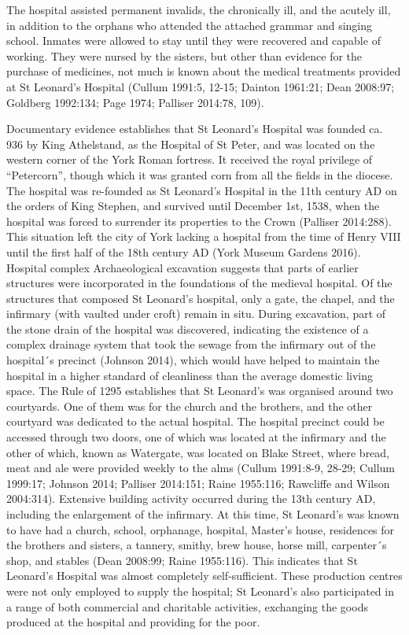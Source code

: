 \documentclass[%
	]{ijsra}
\begin{document}
 The hospital assisted permanent invalids, the chronically ill, and the acutely ill, in addition to the orphans who attended the attached grammar and singing school. Inmates were allowed to stay until they were recovered and capable of working. They were nursed by the sisters, but other than evidence for the purchase of medicines, not much is known about the medical treatments provided at St Leonard’s Hospital (Cullum 1991:5, 12-15; Dainton 1961:21; Dean 2008:97; Goldberg 1992:134; Page 1974; Palliser 2014:78, 109).
 
Documentary evidence establishes that St Leonard’s Hospital was founded ca. 936 by King Athelstand, as the Hospital of St Peter, and was located on the western corner of the York Roman fortress. It received the royal privilege of “Petercorn”, though which it was granted corn from all the fields in the diocese. The hospital was re-founded as St Leonard’s Hospital in the 11th century AD on the orders of King Stephen, and survived until December 1st, 1538, when the hospital was forced to surrender its properties to the Crown (Palliser 2014:288). This situation left the city of York lacking a hospital from the time of Henry VIII until the first half of the 18th century AD (York Museum Gardens 2016).
Hospital complex
Archaeological excavation suggests that parts of earlier structures were incorporated in the foundations of the medieval hospital. Of the structures that composed St Leonard’s hospital, only a gate, the chapel, and the infirmary (with vaulted under croft) remain in situ. During excavation, part of the stone drain of the hospital was discovered, indicating the existence of a complex drainage system that took the sewage from the infirmary out of the hospital´s precinct (Johnson 2014), which would have helped to maintain the hospital in a higher standard of cleanliness than the average domestic living space.
The Rule of 1295 establishes that St Leonard’s was organised around two courtyards. One of them was for the church and the brothers, and the other courtyard was dedicated to the actual hospital. The hospital precinct could be accessed through two doors, one of which was located at the infirmary and the other of which, known as Watergate, was located on Blake Street, where bread, meat and ale were provided weekly to the alms (Cullum 1991:8-9, 28-29; Cullum 1999:17; Johnson 2014; Palliser 2014:151; Raine 1955:116; Rawcliffe and Wilson 2004:314).
Extensive building activity occurred during the 13th century AD, including the enlargement of the infirmary. At this time, St Leonard’s was known to have had a church, school, orphanage, hospital, Master’s house, residences for the brothers and sisters, a tannery, smithy, brew house, horse mill, carpenter´s shop, and stables (Dean 2008:99; Raine 1955:116). This indicates that St Leonard’s Hospital was almost completely self-sufficient. These production centres were not only employed to supply the hospital; St Leonard’s also participated in a range of both commercial and charitable activities, exchanging the goods produced at the hospital and providing for the poor.
\end{document}
